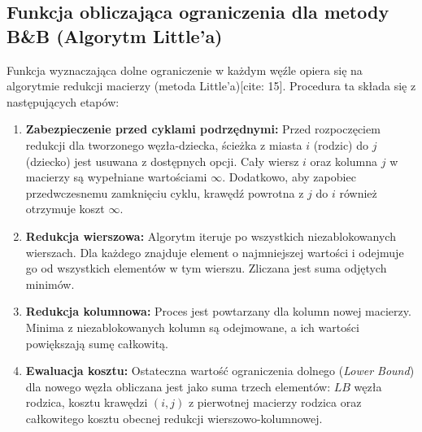 \documentclass[12pt, a4paper]{article}
\begin{document}
\subsection{Funkcja obliczająca ograniczenia dla metody B\&B (Algorytm Little'a)}
Funkcja wyznaczająca dolne ograniczenie w każdym węźle opiera się na algorytmie redukcji macierzy (metoda Little'a)[cite: 15]. Procedura ta składa się z następujących etapów:
\begin{enumerate}
	\item \textbf{Zabezpieczenie przed cyklami podrzędnymi:} Przed rozpoczęciem redukcji dla tworzonego węzła-dziecka, ścieżka z miasta $i$ (rodzic) do $j$ (dziecko) jest usuwana z dostępnych opcji. Cały wiersz $i$ oraz kolumna $j$ w macierzy są wypełniane wartościami $\infty$. Dodatkowo, aby zapobiec przedwczesnemu zamknięciu cyklu, krawędź powrotna z $j$ do $i$ również otrzymuje koszt $\infty$.
	\item \textbf{Redukcja wierszowa:} Algorytm iteruje po wszystkich niezablokowanych wierszach. Dla każdego znajduje element o najmniejszej wartości i odejmuje go od wszystkich elementów w tym wierszu. Zliczana jest suma odjętych minimów.
	\item \textbf{Redukcja kolumnowa:} Proces jest powtarzany dla kolumn nowej macierzy. Minima z niezablokowanych kolumn są odejmowane, a ich wartości powiększają sumę całkowitą.
	\item \textbf{Ewaluacja kosztu:} Ostateczna wartość ograniczenia dolnego (\textit{Lower Bound}) dla nowego węzła obliczana jest jako suma trzech elementów: $LB$ węzła rodzica, kosztu krawędzi $(i, j)$ z pierwotnej macierzy rodzica oraz całkowitego kosztu obecnej redukcji wierszowo-kolumnowej.
\end{enumerate}	

	
	
\end{document}
